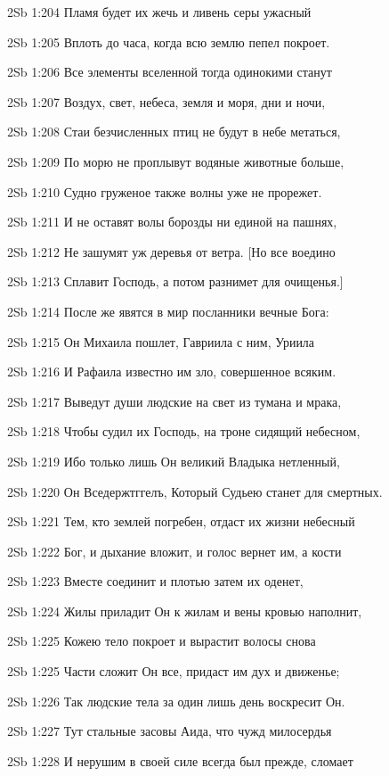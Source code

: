 \vs 2Sb 1:204 Пламя будет их жечь и ливень серы ужасный

\vs 2Sb 1:205 Вплоть до часа, когда всю землю пепел покроет. 

\vs 2Sb 1:206 Все элементы вселенной тогда одинокими станут  

\vs 2Sb 1:207 Воздух, свет, небеса, земля и моря, дни и ночи,  

\vs 2Sb 1:208 Стаи безчисленных птиц не будут в небе метаться,

\vs 2Sb 1:209 По морю не проплывут водяные животные больше,

\vs 2Sb 1:210 Судно груженое также волны уже не прорежет. 

\vs 2Sb 1:211 И не оставят волы борозды ни единой на пашнях, 

\vs 2Sb 1:212 Не зашумят уж деревья от ветра. [Но все воедино 

\vs 2Sb 1:213 Сплавит Господь, а потом разнимет для очищенья.]

\vs 2Sb 1:214 После же явятся в мир посланники вечные Бога:

\vs 2Sb 1:215 Он Михаила пошлет, Гавриила с ним, Уриила

\vs 2Sb 1:216 И Рафаила  известно им зло, совершенное всяким. 

\vs 2Sb 1:217 Выведут души людские на свет из тумана и мрака, 

\vs 2Sb 1:218 Чтобы судил их Господь, на троне сидящий небесном, 

\vs 2Sb 1:219 Ибо только лишь Он великий Владыка нетленный,

\vs 2Sb 1:220 Он Вседержтггелъ, Который Судьею станет для смертных. 

\vs 2Sb 1:221 Тем, кто землей погребен, отдаст их жизни небесный 

\vs 2Sb 1:222 Бог, и дыхание вложит, и голос вернет им, а кости 

\vs 2Sb 1:223 Вместе соединит и плотью затем их оденет, 

\vs 2Sb 1:224 Жилы приладит Он к жилам и вены кровью наполнит, 

\vs 2Sb 1:225 Кожею тело покроет и вырастит волосы снова 

\vs 2Sb 1:225 Части сложит Он все, придаст им дух и движенье; 

\vs 2Sb 1:226 Так людские тела за один лишь день воскресит Он. 

\vs 2Sb 1:227 Тут стальные засовы Аида, что чужд милосердья 

\vs 2Sb 1:228 И нерушим в своей силе всегда был прежде, сломает 

